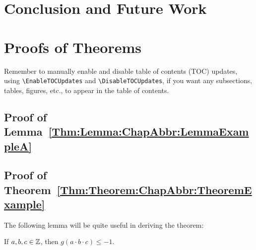 \section{Conclusion and Future Work}
\label{Section:ChapAbbr:Conclusion}

\lipsum[14-15]


\section{Proofs of Theorems}
\label{Section:ChapAbbr:ProofsOfTheorems}

\noindent
{\color{red}%
Remember to manually enable and disable table of contents (TOC) updates, using \verb|\EnableTOCUpdates| and \verb|\DisableTOCUpdates|, if you want any subsections, tables, figures, etc., to appear in the table of contents.}


\DisableTOCUpdates


\subsection{Proof of Lemma~\ref{Thm:Lemma:ChapAbbr:LemmaExampleA}}

\lipsum[16-17]
\qedmarker


\subsection{Proof of Theorem~\ref{Thm:Theorem:ChapAbbr:TheoremExample}}

\lipsum[18]

The following lemma will be quite useful in deriving the theorem:

\begin{Thm:Lemma}
\label{Thm:Lemma:ChapAbbr:LemmaExampleB}
If \mbox{$a,b,c\in{\mathbb{Z}}$}, then \mbox{$g(a\cdot b\cdot c) \leq -1$}.
\end{Thm:Lemma}

